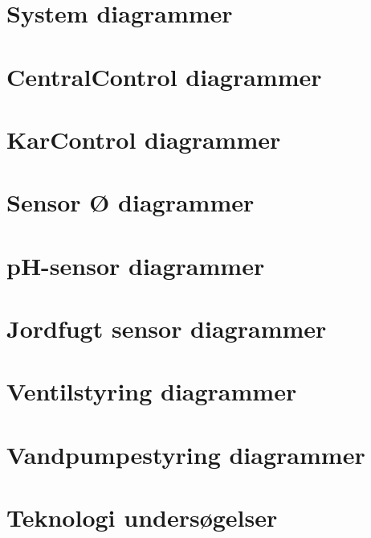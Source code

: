 \section{System diagrammer}



\newpage

\section{CentralControl diagrammer}



\newpage

\section{KarControl diagrammer}



\newpage

\section{Sensor Ø diagrammer}



\newpage

\section{pH-sensor diagrammer}



\newpage

\section{Jordfugt sensor diagrammer}



\newpage

\section{Ventilstyring diagrammer}



\newpage

\section{Vandpumpestyring diagrammer}



\newpage

\newpage

\section{Teknologi undersøgelser}

%